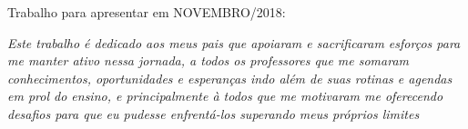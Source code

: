 \documentclass[	12pt, Times, openright, twoside, a4paper, english, brazil]{abntex2}
\begin{document}
%
% 
%
\begin{folhadeaprovacao}
  \begin{center}
    {\ABNTEXchapterfont\large\imprimirautor}

    \vspace*{\fill}\vspace*{\fill}
    {\ABNTEXchapterfont\bfseries\Large\imprimirtitulo}
    \vspace*{\fill}
    
    \hspace{.45\textwidth}
    \begin{minipage}{.5\textwidth}
        \imprimirpreambulo
    \end{minipage}%
    \vspace*{\fill}
   \end{center}
    
   Trabalho para apresentar em NOVEMBRO/2018:

      
   \begin{center}
    \vspace*{0.5cm}
    {\large\imprimirlocal}
    \par
    {\large\imprimirdata}
    \vspace*{1cm}
  \end{center}
  
\end{folhadeaprovacao}

\begin{dedicatoria}
   \vspace*{\fill}
   \centering
   \noindent
   \textit{ Este trabalho é dedicado aos meus pais que apoiaram e sacrificaram esforços para me manter ativo nessa jornada, a todos os professores que me somaram conhecimentos, oportunidades e esperanças indo além de suas rotinas e agendas em prol do ensino, e principalmente à todos que me motivaram me oferecendo desafios para que eu pudesse enfrentá-los superando meus próprios limites } \vspace*{\fill}
\end{dedicatoria}
\end{document}
